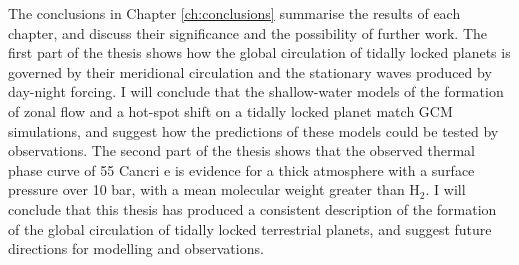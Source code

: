 The conclusions in Chapter \ref{ch:conclusions} summarise the results of each chapter, and discuss their significance and the possibility of further work. The first part of the thesis shows how the global circulation of tidally locked planets is governed by their meridional circulation and the stationary waves produced by day-night forcing. I will conclude that the shallow-water models of the formation of zonal flow and a hot-spot shift on a tidally locked planet match GCM simulations, and suggest how the predictions of these models could be tested by observations. The second part of the thesis shows that the observed thermal phase curve of 55 Cancri e is evidence for a thick atmosphere with a surface pressure over 10 bar, with a mean molecular weight greater than H$_{2}$. I will conclude that this thesis has produced a consistent description of the formation of the global circulation of tidally locked terrestrial planets, and suggest future directions for modelling and observations.



% 
% 
